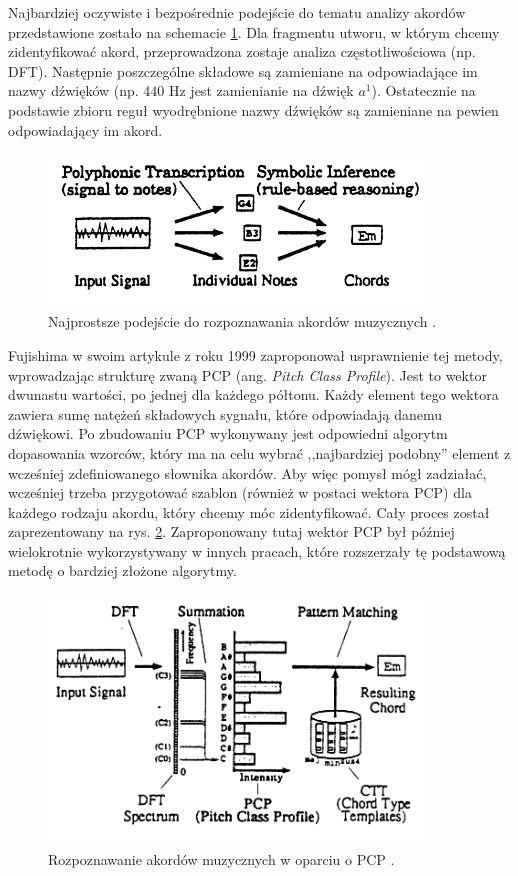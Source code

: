 Najbardziej oczywiste i bezpośrednie podejście do tematu analizy akordów przedstawione zostało na schemacie \ref{fig:rozpoznawanie_stare_1}. Dla fragmentu utworu, w którym chcemy zidentyfikować akord, przeprowadzona zostaje analiza częstotliwościowa (np. DFT). Następnie poszczególne składowe są zamieniane na odpowiadające im nazwy dźwięków (np. $440$ Hz jest zamienianie na dźwięk $a^1$). Ostatecznie na podstawie zbioru reguł wyodrębnione nazwy dźwięków są zamieniane na pewien odpowiadający im akord.

\begin{figure}[htb]
    \centering
    \includegraphics[width=0.9\textwidth]{images/rozpoznawanie_stare_1}
    \caption{Najprostsze podejście do rozpoznawania akordów muzycznych \cite{fujishima_realtime_1999}.}
    \label{fig:rozpoznawanie_stare_1}
\end{figure}

Fujishima \cite{fujishima_realtime_1999} w swoim artykule z roku 1999 zaproponował usprawnienie tej metody, wprowadzając strukturę zwaną PCP (ang. \emph{Pitch Class Profile}). Jest to wektor dwunastu wartości, po jednej dla każdego półtonu. Każdy element tego wektora zawiera sumę natężeń składowych sygnału, które odpowiadają danemu dźwiękowi. Po zbudowaniu PCP wykonywany jest odpowiedni algorytm dopasowania wzorców, który ma na celu wybrać ,,najbardziej podobny'' element z wcześniej zdefiniowanego słownika akordów. Aby więc pomysł mógł zadziałać, wcześniej trzeba przygotować szablon (również w postaci wektora PCP) dla każdego rodzaju akordu, który chcemy móc zidentyfikować. Cały proces został zaprezentowany na rys. \ref{fig:rozpoznawanie_stare_2}. Zaproponowany tutaj wektor PCP był później wielokrotnie wykorzystywany w innych pracach, które rozszerzały tę podstawową metodę o bardziej złożone algorytmy.

\begin{figure}[htb]
    \centering
    \includegraphics[width=0.9\textwidth]{images/rozpoznawanie_stare_2}
    \caption{Rozpoznawanie akordów muzycznych w oparciu o PCP \cite{fujishima_realtime_1999}.}
    \label{fig:rozpoznawanie_stare_2}
\end{figure}
